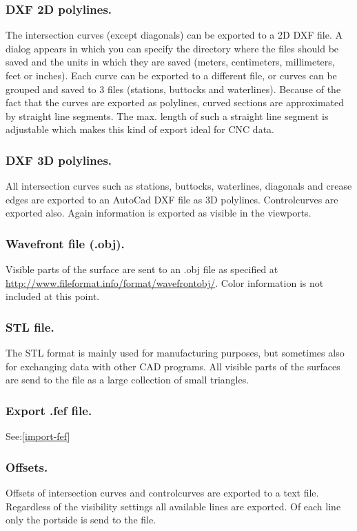 \documentclass[12pt]{article}
\begin{document}
\subsubsection{DXF 2D polylines.}
The intersection curves (except diagonals) can be exported to a 2D DXF file. A dialog appears in
which you can specify the directory where the files should be saved and the units in which they are
saved (meters, centimeters, millimeters, feet or inches). Each curve can be exported to a different
file, or curves can be grouped and saved to 3 files (stations, buttocks and waterlines). Because of
the fact that the curves are exported as polylines, curved sections are approximated by straight line
segments. The max. length of such a straight line segment is adjustable which makes this kind of
export ideal for CNC data.

\subsubsection{DXF 3D polylines.}
All intersection curves such as stations, buttocks, waterlines,
diagonals and crease edges are exported to an AutoCad DXF file as 3D
polylines. Controlcurves are exported also. Again information is
exported as visible in the viewports.

\subsubsection{Wavefront file (.obj).}
Visible parts of the surface are sent to an .obj file as specified at
\url{http://www.fileformat.info/format/wavefrontobj/}. Color information is not included at this point.

\subsubsection{STL file.}
The STL format is mainly used for manufacturing purposes, but
sometimes also for exchanging data with other CAD programs. All
visible parts of the surfaces are send to the file as a large
collection of small triangles.

\subsubsection{Export .fef file.}
See:\ref{import-fef}

\subsubsection{Offsets.}
Offsets of intersection curves and controlcurves are exported to a
text file. Regardless of the visibility settings all available lines
are exported. Of each line only the portside is send to the file.
\end{document}
